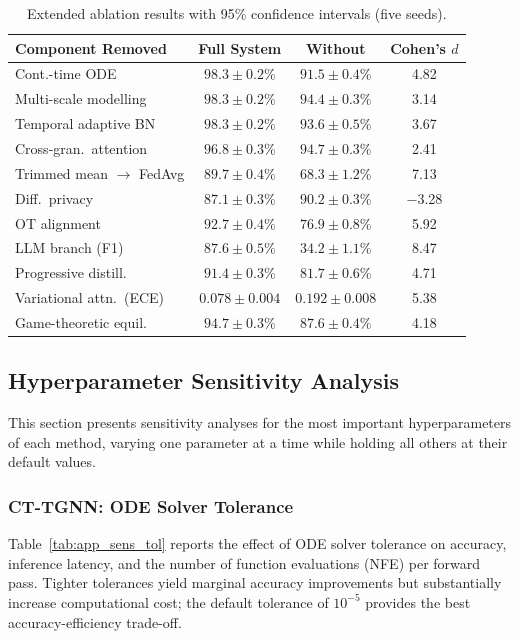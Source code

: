 \begin{table}[htbp]
\centering
\caption{Extended ablation results with 95\% confidence intervals (five seeds).}
\label{tab:app_ablation_ci}
\begin{tabular}{lccc}
\toprule
Component Removed & Full System & Without & Cohen's $d$ \\
\midrule
Cont.-time ODE           & $98.3{\pm}0.2$\% & $91.5{\pm}0.4$\% & 4.82 \\
Multi-scale modelling     & $98.3{\pm}0.2$\% & $94.4{\pm}0.3$\% & 3.14 \\
Temporal adaptive BN      & $98.3{\pm}0.2$\% & $93.6{\pm}0.5$\% & 3.67 \\
Cross-gran.\ attention    & $96.8{\pm}0.3$\% & $94.7{\pm}0.3$\% & 2.41 \\
Trimmed mean $\to$ FedAvg & $89.7{\pm}0.4$\% & $68.3{\pm}1.2$\% & 7.13 \\
Diff.\ privacy            & $87.1{\pm}0.3$\% & $90.2{\pm}0.3$\% & $-$3.28 \\
OT alignment              & $92.7{\pm}0.4$\% & $76.9{\pm}0.8$\% & 5.92 \\
LLM branch (F1)           & $87.6{\pm}0.5$\% & $34.2{\pm}1.1$\% & 8.47 \\
Progressive distill.      & $91.4{\pm}0.3$\% & $81.7{\pm}0.6$\% & 4.71 \\
Variational attn.\ (ECE)  & $0.078{\pm}0.004$ & $0.192{\pm}0.008$ & 5.38 \\
Game-theoretic equil.     & $94.7{\pm}0.3$\% & $87.6{\pm}0.4$\% & 4.18 \\
\bottomrule
\end{tabular}
\end{table}


\subsection{Hyperparameter Sensitivity Analysis}
\label{app:sensitivity}

This section presents sensitivity analyses for the most important hyperparameters of each method, varying one parameter at a time while holding all others at their default values.

\subsubsection{CT-TGNN: ODE Solver Tolerance}

Table~\ref{tab:app_sens_tol} reports the effect of ODE solver tolerance on accuracy, inference latency, and the number of function evaluations (NFE) per forward pass. Tighter tolerances yield marginal accuracy improvements but substantially increase computational cost; the default tolerance of $10^{-5}$ provides the best accuracy-efficiency trade-off.

